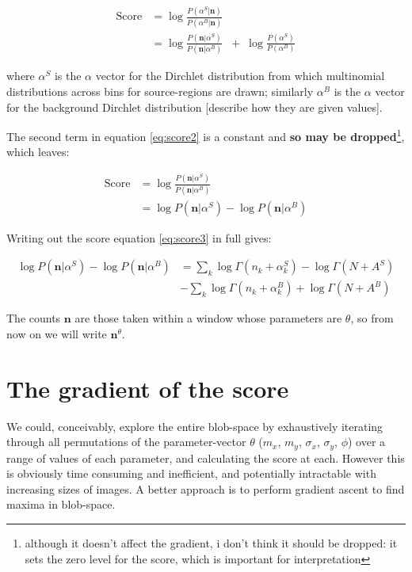 \documentclass{report}
\begin{document}
\begin{align}
\text{Score} &= \log \frac{P(\alpha^S | \textbf{n})}{P(\alpha^B | \textbf{n})} \label{eq:score} \\
&= \log \frac{P(\textbf{n} | \alpha^S)}{P(\textbf{n} | \alpha^B)} \;\; + \; \log \frac{P(\alpha^S)}{P(\alpha^B)}\label{eq:score2}
\end{align}

where $\alpha^S$ is the $\alpha$ vector for the Dirchlet distribution from which multinomial distributions across bins for source-regions are drawn; similarly $\alpha^B$ is the $\alpha$ vector for the background Dirchlet distribution [describe how they are given values].

The second term in equation \ref{eq:score2} is a constant and {\bf so may be dropped}\footnote{although it doesn't affect the gradient, i don't think it should be dropped: it sets the zero level for the score, which is important for interpretation}, which leaves:

\begin{align}
\text{Score} &= \log \frac{P(\textbf{n} | \alpha^S)}{P(\textbf{n} | \alpha^B)} \\
&= \log {P(\textbf{n} | \alpha^S)} - \log {P(\textbf{n} | \alpha^B)} \label{eq:score3}
\end{align}

Writing out the score equation \ref{eq:score3} in full gives:

\begin{align*}
\log {P(\textbf{n} | \alpha^S)} - \log {P(\textbf{n} | \alpha^B)} &= \sum_k \log \Gamma (n_k + \alpha^S_k) - \log \Gamma (N + A^S) \\
&- \sum_k \log \Gamma (n_k + \alpha^B_k) + \log \Gamma (N + A^B) \label{eq:dirmult-score}
\end{align*}

The counts $\textbf{n}$ are those taken within a window whose parameters are $\theta$, so from now on we will write  $\textbf{n}^{\theta}$.


\section{The gradient of the score}

We could, conceivably, explore the entire blob-space by exhaustively
iterating through all permutations of the parameter-vector $\theta$
($m_x$, $m_y$, $\sigma_x$, $\sigma_y$, $\phi$) over a range of values
of each parameter, and calculating the score at each. However this is
obviously time consuming and inefficient, and potentially intractable
with increasing sizes of images. A better approach is to perform
gradient ascent to find maxima in blob-space.
\end{document}
